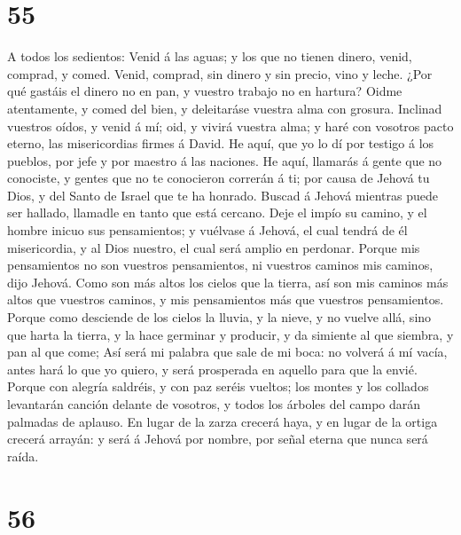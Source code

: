 \hypertarget{section-54}{%
\section{55}\label{section-54}}

 A todos los sedientos: Venid á las aguas; y los que no
tienen dinero, venid, comprad, y comed. Venid, comprad, sin dinero y sin
precio, vino y leche.  ¿Por qué gastáis el dinero no en
pan, y vuestro trabajo no en hartura? Oidme atentamente, y comed del
bien, y deleitaráse vuestra alma con grosura.  Inclinad
vuestros oídos, y venid á mí; oid, y vivirá vuestra alma; y haré con
vosotros pacto eterno, las misericordias firmes á David. 
He aquí, que yo lo dí por testigo á los pueblos, por jefe y por maestro
á las naciones.  He aquí, llamarás á gente que no
conociste, y gentes que no te conocieron correrán á ti; por causa de
Jehová tu Dios, y del Santo de Israel que te ha honrado. 
Buscad á Jehová mientras puede ser hallado, llamadle en tanto que está
cercano.  Deje el impío su camino, y el hombre inicuo sus
pensamientos; y vuélvase á Jehová, el cual tendrá de él misericordia, y
al Dios nuestro, el cual será amplio en perdonar.  Porque
mis pensamientos no son vuestros pensamientos, ni vuestros caminos mis
caminos, dijo Jehová.  Como son más altos los cielos que
la tierra, así son mis caminos más altos que vuestros caminos, y mis
pensamientos más que vuestros pensamientos.  Porque como
desciende de los cielos la lluvia, y la nieve, y no vuelve allá, sino
que harta la tierra, y la hace germinar y producir, y da simiente al que
siembra, y pan al que come;  Así será mi palabra que sale
de mi boca: no volverá á mí vacía, antes hará lo que yo quiero, y será
prosperada en aquello para que la envié.  Porque con
alegría saldréis, y con paz seréis vueltos; los montes y los collados
levantarán canción delante de vosotros, y todos los árboles del campo
darán palmadas de aplauso.  En lugar de la zarza crecerá
haya, y en lugar de la ortiga crecerá arrayán: y será á Jehová por
nombre, por señal eterna que nunca será raída.

\hypertarget{section-55}{%
\section{56}\label{section-55}}

